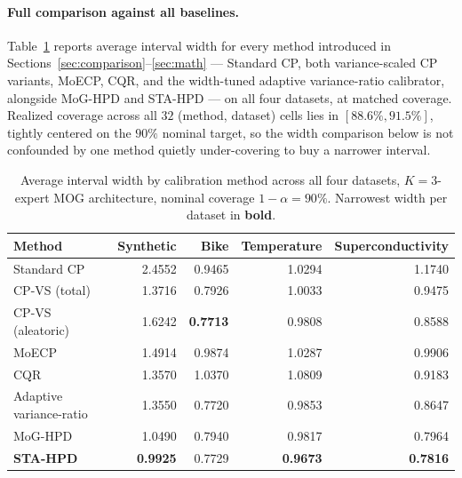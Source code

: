 \documentclass[10pt,twocolumn,a4paper]{article}
\begin{document}
\paragraph{Full comparison against all baselines.} Table~\ref{tab:allmethods} reports average
interval width for every method introduced in Sections~\ref{sec:comparison}--\ref{sec:math} —
Standard CP, both variance-scaled CP variants, MoECP, CQR, and the width-tuned adaptive
variance-ratio calibrator, alongside MoG-HPD and STA-HPD — on all four datasets, at matched
coverage. Realized coverage across all $32$ (method, dataset) cells lies in $[88.6\%,91.5\%]$,
tightly centered on the $90\%$ nominal target, so the width comparison below is not confounded by
one method quietly under-covering to buy a narrower interval.

\begin{table}[t]
\centering
\small
\caption{Average interval width by calibration method across all four datasets, $K{=}3$-expert MOG
architecture, nominal coverage $1-\alpha=90\%$. Narrowest width per dataset in \textbf{bold}.}
\label{tab:allmethods}
\begin{tabular}{@{}lrrrr@{}}
\toprule
\textbf{Method} & \textbf{Synthetic} & \textbf{Bike} & \textbf{Temperature} & \textbf{Superconductivity} \\
\midrule
Standard CP              & 2.4552 & 0.9465 & 1.0294 & 1.1740 \\
CP-VS (total)             & 1.3716 & 0.7926 & 1.0033 & 0.9475 \\
CP-VS (aleatoric)         & 1.6242 & \textbf{0.7713} & 0.9808 & 0.8588 \\
MoECP                     & 1.4914 & 0.9874 & 1.0287 & 0.9906 \\
CQR                       & 1.3570 & 1.0370 & 1.0809 & 0.9183 \\
Adaptive variance-ratio   & 1.3550 & 0.7720 & 0.9853 & 0.8647 \\
MoG-HPD                   & 1.0490 & 0.7940 & 0.9817 & 0.7964 \\
\textbf{STA-HPD}          & \textbf{0.9925} & 0.7729 & \textbf{0.9673} & \textbf{0.7816} \\
\bottomrule
\end{tabular}
\end{table}
\end{document}
